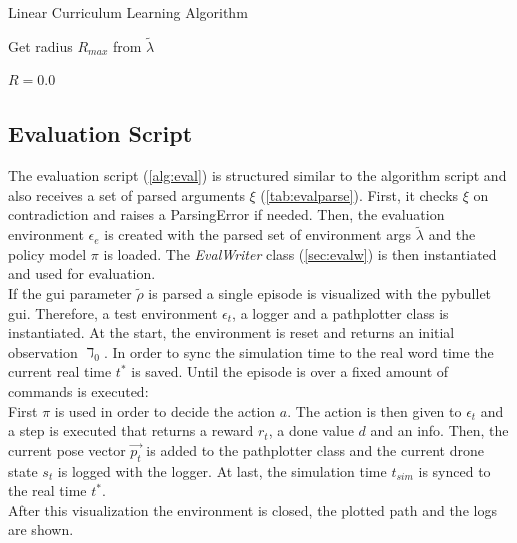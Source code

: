 \begin{algorithm}
	\caption{Linear Curriculum Learning Algorithm}
	\label{alg:curri}
	
	Get radius $R_{max}$ from $\tilde{\lambda}$
	
	$R = 0.0$
	
\end{algorithm}

\subsection{Evaluation Script}
The evaluation script (\cref{alg:eval}) is structured similar to the algorithm script and also receives a set of
parsed arguments $\xi$ (\cref{tab:evalparse}). 
First, it checks $\xi$ on contradiction and raises a ParsingError if needed. 
Then, the evaluation environment $\epsilon_e$ is created with the parsed set of environment args $\tilde{\lambda}$ and the policy model $\pi$ is loaded. 
The \emph{EvalWriter} class (\cref{sec:evalw}) is then instantiated and used for evaluation.\\
If the gui parameter $\tilde{\rho}$ is parsed a single episode is visualized with the pybullet gui. 
Therefore, a test environment $\epsilon_t$, a logger and a pathplotter class is instantiated.
At the start, the environment is reset and returns an initial observation $\daleth_0$. 
In order to sync the simulation time to the real word time the current real time $t^*$ is saved.
Until the episode is over a fixed amount of commands is executed:\\
\newline
First $\pi$ is used in order to decide the action $a$. 
The action is then given to $\epsilon_t$ and a step is executed that returns a reward $r_t$, a done value $d$ and an info.
Then, the current pose vector $\overrightarrow{p_t}$ is added to the pathplotter class and the current drone state $s_t$ is logged with the logger. 
At last, the simulation time $t_{sim}$ is synced to the real time $t^*$.\\
\newline
After this visualization the environment is closed, the plotted path and the logs are shown.

